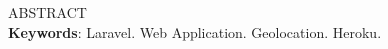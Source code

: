 
\begin{resumo}[ABSTRACT]
\begin{SingleSpacing}


ABSTRACT\\

\textbf{Keywords}: Laravel. Web Application. Geolocation. Heroku.

\end{SingleSpacing}
\end{resumo}
